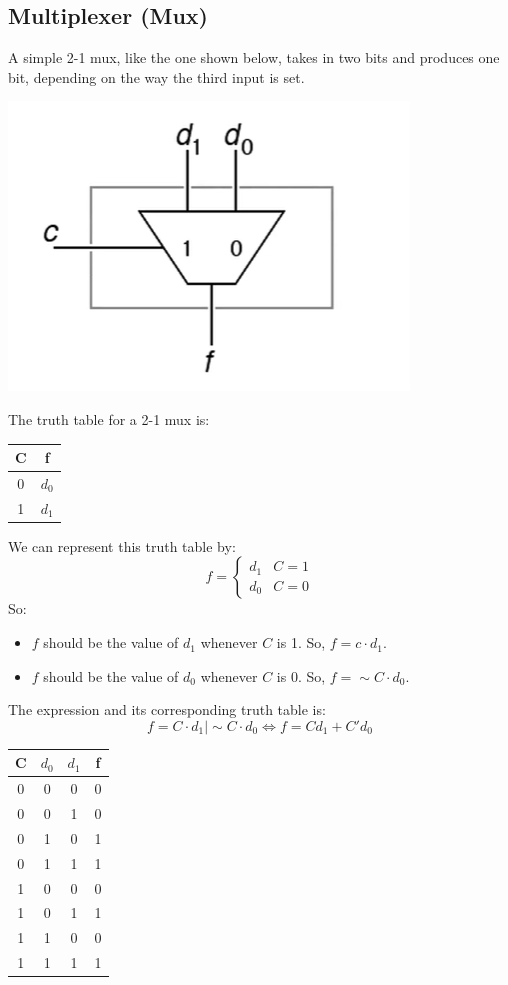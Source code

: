 \documentclass[letterpaper]{article}
\begin{document}
\subsection{Multiplexer (Mux)}
A simple 2-1 mux, like the one shown below, takes in two bits and produces one bit, depending on the way the third input is set.
\begin{center}
    \includegraphics[scale=0.4]{img/mux.PNG}
\end{center}
The truth table for a 2-1 mux is:
\begin{center}
    \begin{tabular}{c|c}
        C & f \\ 
       \hline 
        0 & $d_0$ \\ 
        1 & $d_1$
    \end{tabular}
\end{center}
We can represent this truth table by:
\[f = \begin{cases}
    d_1 & C = 1 \\
    d_0 & C = 0
\end{cases}\]
So:
\begin{itemize}
    \item $f$ should be the value of $d_1$ whenever $C$ is 1. So, $f = c \cdot d_1$.
    \item $f$ should be the value of $d_0$ whenever $C$ is 0. So, $f = \sim C \cdot d_0$. 
\end{itemize}
The expression and its corresponding truth table is:
\[f = C \cdot d_1 \mid \sim C \cdot d_0 \iff f = Cd_1 + C'd_0\]
\begin{center}
    \begin{tabular}{c|c c|c}
        C & $d_0$ & $d_1$ & f \\ 
        \hline 
        0 & 0 & 0 & 0 \\ 
        0 & 0 & 1 & 0 \\ 
        0 & 1 & 0 & 1 \\ 
        0 & 1 & 1 & 1 \\ 
        1 & 0 & 0 & 0 \\ 
        1 & 0 & 1 & 1 \\ 
        1 & 1 & 0 & 0 \\ 
        1 & 1 & 1 & 1
    \end{tabular}
\end{center}
\end{document}
